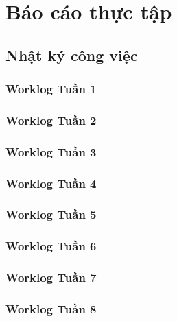 \providecommand{\tightlist}{%
  \setlength{\itemsep}{0pt}\setlength{\parskip}{0pt}%
}

\section{Báo cáo thực tập}

\subsection{Nhật ký công việc}

\subsubsection{Worklog Tuần 1}


\subsubsection{Worklog Tuần 2}


\subsubsection{Worklog Tuần 3}


\subsubsection{Worklog Tuần 4}


\subsubsection{Worklog Tuần 5}


\subsubsection{Worklog Tuần 6}


\subsubsection{Worklog Tuần 7}


\subsubsection{Worklog Tuần 8}


